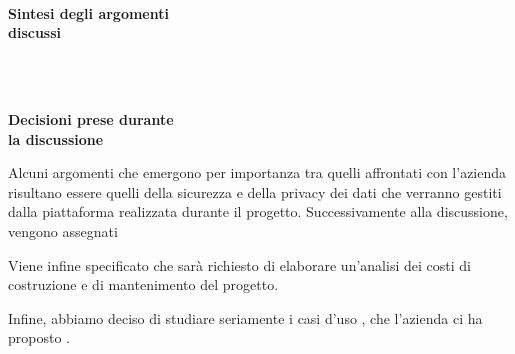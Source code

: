 \documentclass[10pt, a4paper]{article}
\title{\data}
\author{SWEetCode}
\begin{document}


\setlength{\columnsep}{2.2em}
\setlength{\columnseprule}{4pt}
\begin{paracol}{2}


\intestazione
\vspace{5.0em}

\partecipanti

\newpage

\switchcolumn
\revisioneAzioni
\vspace{21em}

\ordineGiorno

\newpage


\switchcolumn

\\
\textbf{Sintesi degli argomenti\\discussi}

~\newpage
\vspace{5cm}

\\
\textbf{Decisioni prese durante\\la discussione}

\switchcolumn

\discussione
Alcuni argomenti che emergono per importanza tra quelli affrontati con l'azienda risultano essere quelli della sicurezza e della privacy dei dati che verranno gestiti dalla piattaforma realizzata durante il progetto.
Successivamente alla discussione, vengono assegnati

Viene infine specificato che sarà richiesto di elaborare un'analisi dei costi di costruzione e di mantenimento del progetto.

Infine, abbiamo deciso di studiare seriamente i casi d'uso , che l'azienda ci ha proposto .

\vspace{12.5em}

\decisioni

\end{paracol}
\end{document}

